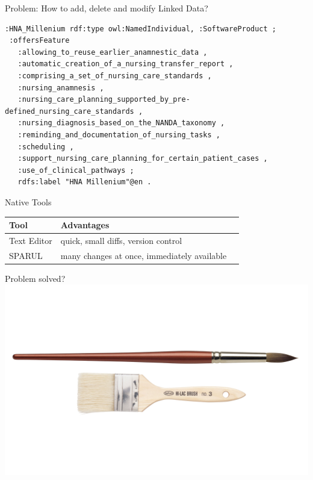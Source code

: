 \documentclass[aspectratio=1610]{beamer}
\begin{document}
\begin{frame}[fragile]{Problem: How to add, delete and modify Linked Data?}
\begin{verbatim}
:HNA_Millenium rdf:type owl:NamedIndividual, :SoftwareProduct ;
 :offersFeature
   :allowing_to_reuse_earlier_anamnestic_data ,
   :automatic_creation_of_a_nursing_transfer_report ,
   :comprising_a_set_of_nursing_care_standards ,
   :nursing_anamnesis ,
   :nursing_care_planning_supported_by_pre-defined_nursing_care_standards ,
   :nursing_diagnosis_based_on_the_NANDA_taxonomy ,
   :reminding_and_documentation_of_nursing_tasks ,
   :scheduling ,
   :support_nursing_care_planning_for_certain_patient_cases ,
   :use_of_clinical_pathways ;
   rdfs:label "HNA Millenium"@en .
\end{verbatim}
\end{frame}



\begin{frame}{Native Tools}
\centering
\begin{tabulary}{\textwidth}{lLL}
\toprule
Tool		&Advantages\\					
\midrule
Text Editor	&quick, small diffs, version control\\
SPARUL		&many changes at once, immediately available\\
\bottomrule
\end{tabulary}
\end{frame}

\begin{frame}{Problem solved?}
\centering
\includegraphics[width=0.9\paperwidth]{img/texteditorsparul.png}
\end{frame}
\end{document}
